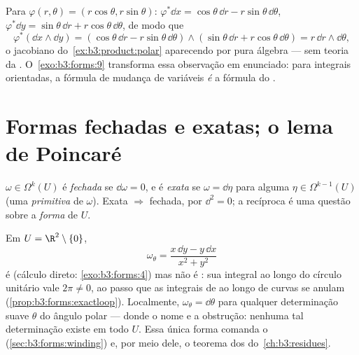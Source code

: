 \begin{example}\label{ex:b3:forms:polar}
Para $\varphi(r, \theta) = (r\cos\theta, r\sin\theta)$: $\varphi^*\dd x = \cos\theta\,\dd r -
r\sin\theta\,\dd\theta$, $\varphi^*\dd y = \sin\theta\,\dd r
+ r\cos\theta\,\dd\theta$, de modo que
\[
\varphi^*(\dd x \wedge \dd y) =
(\cos\theta\,\dd r - r\sin\theta\,\dd\theta) \wedge
(\sin\theta\,\dd r + r\cos\theta\,\dd\theta)
= r\,\dd r \wedge \dd\theta,
\]
o jacobiano do~\cref{ex:b3:product:polar} aparecendo por pura álgebra --- sem teoria
da . O~\cref{exo:b3:forms:9} transforma essa observação em enunciado:
para integrais orientadas, a fórmula de mudança de variáveis \emph{é} a
fórmula do .
\end{example}

\section{Formas fechadas e exatas; o lema de Poincaré}

\begin{definition}\label{def:b3:forms:closedexact}
$\omega \in \Omega^k(U)$ é \emph{fechada} se $\dd\omega = 0$, e é
\emph{exata} se $\omega = \dd\eta$ para alguma $\eta \in \Omega^{k-1}(U)$ (uma
\emph{primitiva} de $\omega$). Exata $\Rightarrow$ fechada, por $\dd^2 = 0$; a
recíproca é uma questão sobre a \emph{forma} de $U$.
\end{definition}

\begin{example}\label{ex:b3:forms:angular}
Em $U = \R^2 \setminus \{0\}$,
\[
\omega_\theta = \frac{x\,\dd y - y\,\dd x}{x^2 + y^2}
\]
é  (cálculo direto: \cref{exo:b3:forms:4}) mas não é : sua integral
ao longo do círculo unitário vale $2\pi \neq 0$, ao passo que as integrais de
 ao longo de curvas  se anulam
(\cref{prop:b3:forms:exactloop}). Localmente, $\omega_\theta = \dd\theta$ para qualquer determinação suave
$\theta$ do ângulo polar --- donde o nome e a obstrução: nenhuma tal
determinação existe em todo $U$. Essa única forma comanda o  (\cref{sec:b3:forms:winding}) e, por meio dele, o teorema dos  do~\cref{ch:b3:residues}.
\end{example}

